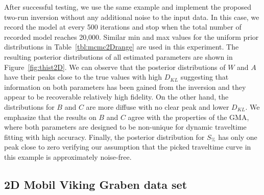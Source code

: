 

After successful testing, we use the same example and implement the proposed two-run inversion without any additional noise to the input data. In this case, we record the model at every 500 iterations and stop when the total number of recorded model reaches 20,000. Similar min and max values for the uniform prior distributions in Table~\ref{tbl:mcmc2Drange} are used in this experiment. The resulting posterior distributions of all estimated parameters are shown in Figure~\ref{fig:thist2D}. We can observe that the posterior distributions of $W$ and $A$ have their peaks close to the true values with high $D_{KL}$ suggesting that information on both parameters has been gained from the inversion and they appear to be recoverable relatively high fidelity. On the other hand, the distributions for $B$ and $C$ are more diffuse with no clear peak and lower $D_{KL}$. We emphasize that the results on $B$ and $C$ agree with the properties of the GMA, where both parameters are designed to be non-unique for dynamic traveltime fitting with high accuracy. Finally, the posterior distribution for $S_{\%}$ has only one peak close to zero verifying our assumption that the picked traveltime curve in this example is approximately noise-free.


\subsection{2D Mobil Viking Graben data set}

